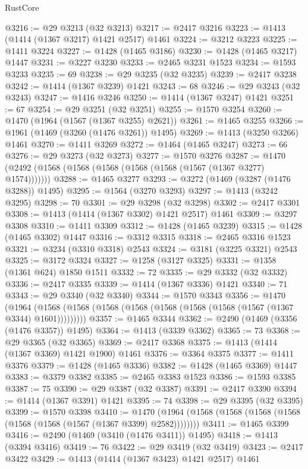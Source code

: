\begin{lexlean}{RustCore}
\begin{coremodule}
@3216 := @29 @3213 (@32 @3213)
@3217 := @2417 @3216
@3223 := @1413 (@1414 (@1367 @3217) @1421 @2517) @1461
@3224 := @3212 @3223
@3225 := @1411 @3224
@3227 := @1428 (@1465 @3186)
@3230 := @1428 (@1465 @3217) @1447
@3231 := @3227 @3230
@3233 := @2465 @3231 @1523
@3234 := @1593 @3233
@3235 := 69
@3238 := @29 @3235 (@32 @3235)
@3239 := @2417 @3238
@3242 := @1414 (@1367 @3239) @1421
@3243 := 68
@3246 := @29 @3243 (@32 @3243)
@3247 := @1416 @3246
@3250 := @1414 (@1367 @3247) @1421
@3251 := 67
@3254 := @29 @3251 (@32 @3251)
@3255 := @1570 @3254
@3260 := @1470 (@1964 (@1567 (@1367 @3255) @2621))
@3261 := @1465 @3255
@3266 := @1961 (@1469 (@3260 (@1476 @3261)) @1495)
@3269 := @1413 (@3250 @3266) @1461
@3270 := @1411 @3269
@3272 := @1464 (@1465 @3247)
@3273 := 66
@3276 := @29 @3273 (@32 @3273)
@3277 := @1570 @3276
@3287 := @1470 (@2492 (@1568 (@1568 (@1568 (@1568 (@1568 (@1567 (@1367 @3277) @1574)))))))
@3288 := @1465 @3277
@3293 := @3272 (@1469 (@3287 (@1476 @3288)) @1495)
@3295 := @1564 (@3270 @3293)
@3297 := @1413 (@3242 @3295)
@3298 := 70
@3301 := @29 @3298 (@32 @3298)
@3302 := @2417 @3301
@3308 := @1413 (@1414 (@1367 @3302) @1421 @2517) @1461
@3309 := @3297 @3308
@3310 := @1411 @3309
@3312 := @1428 (@1465 @3239)
@3315 := @1428 (@1465 @3302) @1447
@3316 := @3312 @3315
@3318 := @2465 @3316 @1523
@3321 := @3234 (@3310 @3318) @2543
@3324 := @3181 (@3225 @3321) @2543
@3325 := @3172 @3324
@3327 := @1258 (@3127 @3325)
@3331 := @1358 (@1361 @624) @1850 @1511
@3332 := 72
@3335 := @29 @3332 (@32 @3332)
@3336 := @2417 @3335
@3339 := @1414 (@1367 @3336) @1421
@3340 := 71
@3343 := @29 @3340 (@32 @3340)
@3344 := @1570 @3343
@3356 := @1470
    (@1964 (@1568 (@1568 (@1568 (@1568 (@1568 (@1568 (@1568 (@1567 (@1367 @3344) @1601)))))))))
@3357 := @1465 @3344
@3362 := @2490 (@1469 (@3356 (@1476 @3357)) @1495)
@3364 := @1413 (@3339 @3362)
@3365 := 73
@3368 := @29 @3365 (@32 @3365)
@3369 := @2417 @3368
@3375 := @1413 (@1414 (@1367 @3369) @1421 @1900) @1461
@3376 := @3364 @3375
@3377 := @1411 @3376
@3379 := @1428 (@1465 @3336)
@3382 := @1428 (@1465 @3369) @1447
@3383 := @3379 @3382
@3385 := @2465 @3383 @1523
@3386 := @1593 @3385
@3387 := 75
@3390 := @29 @3387 (@32 @3387)
@3391 := @2417 @3390
@3394 := @1414 (@1367 @3391) @1421
@3395 := 74
@3398 := @29 @3395 (@32 @3395)
@3399 := @1570 @3398
@3410 := @1470 (@1964 (@1568 (@1568 (@1568 (@1568 (@1568 (@1568 (@1567 (@1367 @3399) @2582))))))))
@3411 := @1465 @3399
@3416 := @2490 (@1469 (@3410 (@1476 @3411)) @1495)
@3418 := @1413 (@3394 @3416)
@3419 := 76
@3422 := @29 @3419 (@32 @3419)
@3423 := @2417 @3422
@3429 := @1413 (@1414 (@1367 @3423) @1421 @2517) @1461

\end{coremodule}
\end{lexlean}

